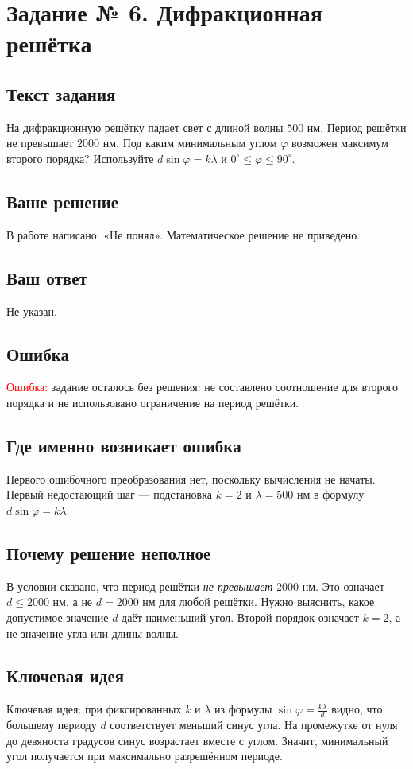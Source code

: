 \documentclass[12pt,a4paper]{article}
\begin{document}
\clearpage
{}\label{task:6}
\section*{Задание № 6. Дифракционная решётка}
\subsection*{Текст задания}
На дифракционную решётку падает свет с длиной волны $500$ нм. Период решётки не превышает $2000$ нм. Под каким минимальным углом $\varphi$ возможен максимум второго порядка? Используйте $d\sin\varphi=k\lambda$ и $0^\circ\le\varphi\le90^\circ$.

\subsection*{Ваше решение}
В работе написано: «Не понял». Математическое решение не приведено.

\subsection*{Ваш ответ}
Не указан.

\subsection*{Ошибка}
\textcolor{red}{Ошибка:} задание осталось без решения: не составлено соотношение для второго порядка и не использовано ограничение на период решётки.

\subsection*{Где именно возникает ошибка}
Первого ошибочного преобразования нет, поскольку вычисления не начаты. Первый недостающий шаг --- подстановка $k=2$ и $\lambda=500$ нм в формулу $d\sin\varphi=k\lambda$.

\subsection*{Почему решение неполное}
В условии сказано, что период решётки \emph{не превышает} $2000$ нм. Это означает $d\le2000$ нм, а не $d=2000$ нм для любой решётки. Нужно выяснить, какое допустимое значение $d$ даёт наименьший угол. Второй порядок означает $k=2$, а не значение угла или длины волны.

\subsection*{Ключевая идея}
\textcolor{blue!60!black}{Ключевая идея:} при фиксированных $k$ и $\lambda$ из формулы $\sin\varphi=\frac{k\lambda}{d}$ видно, что большему периоду $d$ соответствует меньший синус угла. На промежутке от нуля до девяноста градусов синус возрастает вместе с углом. Значит, минимальный угол получается при максимально разрешённом периоде.
\end{document}
